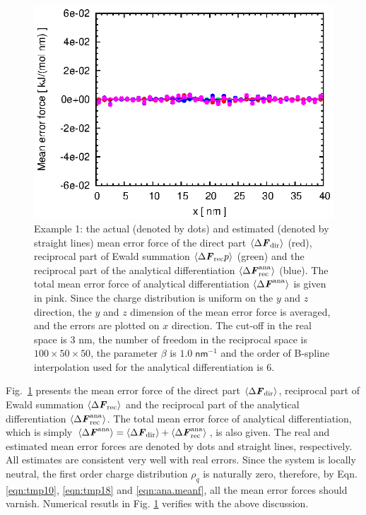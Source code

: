 \documentclass[aps,pre,preprint]{revtex4}
\renewcommand{\v}[1]{\textbf{\textit{#1}}}
\begin{document}
\begin{figure}
  \centering
  \includegraphics[]{fig/error.one_peak.box40x20x20.b1.000.r3.00.n6.K101x051x051/fig.ana.ewald.meanf.eps}
  \caption{Example 1: the actual (denoted by dots) and estimated
    (denoted by straight lines) mean error force of the direct part
    $\langle\Delta \v F_{\textrm{dir}}\rangle$ (red), reciprocal
    part of Ewald summation $\langle\Delta \v F_{\textrm{rec}}p\rangle$ (green) and the reciprocal part of the analytical
    differentiation $\langle\Delta \v
    F^{\textrm{ana}}_{\textrm{rec}}\rangle$ (blue). The total
    mean error force of analytical differentiation $\langle\Delta \v
    F^{\textrm{ana}}\rangle$ is given in pink.  Since the charge
    distribution is uniform on the $y$ and $z$ direction, the $y$ and
    $z$ dimension of the mean error force is averaged, and the errors
    are plotted on $x$ direction.  The cut-off in the real space is 3
    \textsf{nm}, the number of freedom in the reciprocal space is
    $100\times 50\times 50$, the parameter $\beta$ is $1.0\;
    \textsf{nm}^{-1}$ and the order of B-spline interpolation used for
    the analytical differentiation is 6.}
  \label{fig:meanf1}
\end{figure}

Fig.~\ref{fig:meanf1} presents the mean error force of the direct part
$\langle\Delta \v F_{\textrm{dir}}\rangle$, reciprocal part of Ewald
summation $\langle\Delta \v F_{\textrm{rec}}\rangle$ and the
reciprocal part of the analytical differentiation $\langle\Delta \v
F^{\textrm{ana}}_{\textrm{rec}}\rangle$. The total mean error force of
analytical differentiation, which is simply $\langle\Delta \v
F^{\textrm{ana}}\rangle = \langle\Delta \v F_{\textrm{dir}}\rangle +
\langle\Delta \v F^{\textrm{ana}}_{\textrm{rec}}\rangle$, is also
given.  The real and estimated mean error forces are denoted by dots
and straight lines, respectively. All estimates are consistent very
well with real errors.  Since the system is locally neutral, the first
order charge distribution $\rho_q$ is naturally zero, therefore, by
Eqn. \eqref{eqn:tmp10}, \eqref{eqn:tmp18} and \eqref{eqn:ana.meanf}, all
the mean error forces should varnish. Numerical resutls in
Fig. \ref{fig:meanf1} verifies with the above discussion.
\end{document}
